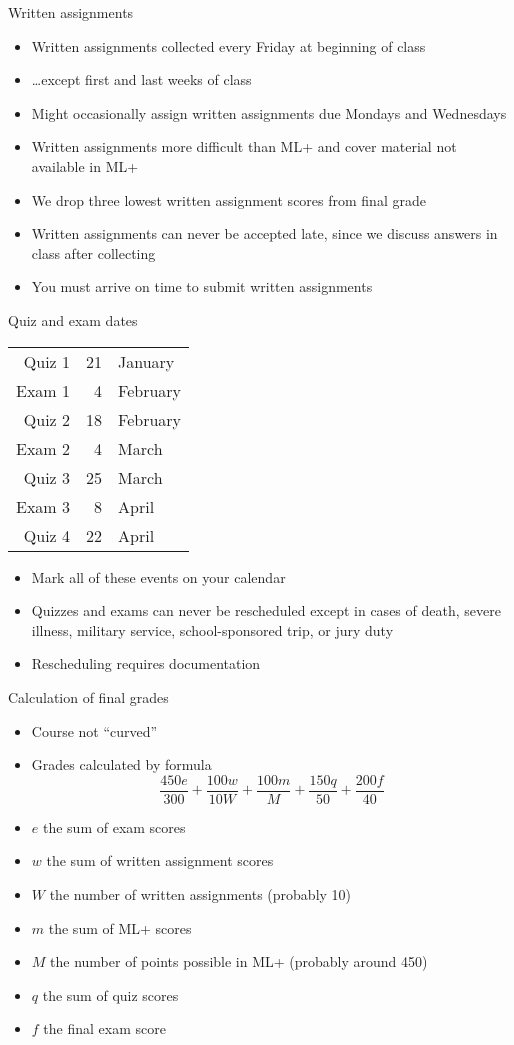 \documentclass[handout,xcolor=dvipsnames]{beamer}
\theoremstyle{definition}
\begin{document}
\begin{frame}{Written assignments}
\begin{itemize}
\item Written assignments collected \alert{every Friday}
at \alert{beginning} of class
\item \dots except first and last weeks of class
\item Might occasionally assign written assignments
due Mondays and Wednesdays
\item Written assignments more difficult than ML+ and
cover material not available in ML+
\item We drop three lowest written assignment scores from final grade
\item Written assignments can \alert{never} be accepted late,
since we discuss answers in class after collecting
\item You must arrive on time to submit written assignments
\end{itemize}
\end{frame}

\begin{frame}{Quiz and exam dates}
\begin{center}\begin{tabular}{rrl}
Quiz 1&21&January\\
Exam 1&4&February\\
Quiz 2&18&February\\
Exam 2&4&March\\
Quiz 3&25&March\\
Exam 3&8&April\\
Quiz 4&22&April
\end{tabular}\end{center}
\begin{itemize}
\item Mark all of these events on your calendar
\item Quizzes and exams can \alert{never} be rescheduled
except in cases of death, severe illness, military service,
school-sponsored trip, or jury duty
\item Rescheduling requires documentation
\end{itemize}
\end{frame}

\begin{frame}{Calculation of final grades}
\begin{itemize}
\item Course not ``curved''
\item Grades calculated by formula
\[\frac{450e}{300}+\frac{100w}{10W}
+\frac{100m}{M}+\frac{150q}{50}+\frac{200f}{40}\]
\item $e$ the sum of exam scores
\item $w$ the sum of written assignment scores
\item $W$ the number of written assignments (probably 10)
\item $m$ the sum of ML+ scores
\item $M$ the number of points possible in ML+ (probably around 450)
\item $q$ the sum of quiz scores
\item $f$ the final exam score
\end{itemize}
\end{frame}
\end{document}
